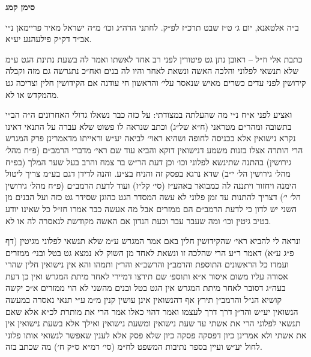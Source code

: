 \documentclass[12pt, openany]{book}
\newcommand{\chapname}{}
\newcommand{\newchap}[1]{
	\addcontentsline{toc}{chapter}{#1}
	\renewcommand{\chapname}{#1}
		\begin{center}
			\textbf{%
\fontsize{16pt}{16pt}\selectfont
				#1}
		\end{center}
}
\begin{document}
\newchap{סימן קמג}
\begin{multicols}{2}
ב״ה אלטאנא, יום ג׳ ט״ז שבט תרכ״ז לפ״ק. לחתני הרה״ג וכו׳ מ״ה ישראל מאיר פריימאן נ״י אב״ד דק״ק פילעהנע יע״א.\\\vspace{0pt}

כתבת אלי וז״ל – ראובן נתן גט פיטורין לפני רב אחד לאשתו ואמר לה בשעת נתינת הגט ע״מ שלא תנשאי לפלוני והלכה האשה ונשאת לאחר והיו לה בנים ואח״כ נתגרשה גם מזה וקבלה קידושין לפני עדים כשרים מאיש שנאסר עלי׳ והראשון חי עודנה אם הקידושין חלין וצריכה גט מהמקדש או לא.\\\vspace{0pt}

ואציע לפני א״ח נ״י מה שהעלתה במצודתי: על כזה כבר נשאלו גדולי האחרונים ה״ה הב״י בתשובה ומהר״ם מטראני (ח״א של״ג) וכתב שנראה לו פשוט שלא עברה על התנאי דאינו נקרא נישואין אלא בכניסה לחופה ושהיא ראוי׳ לביאה יע״ש וראייתו מדאמרינן פרק המגרש הרי הותרה אצלו בזנות משמע דנישואין דוקא והביא עוד שם ראי׳ מדברי הרמב״ם (פ״ח מהל׳ גירושין) בהתנה שתינשא לפלוני וכו׳ וכן דעת הר״ש בר צמח והרב בעל שער המלך (בפ״ח מהל׳ גירושין הל׳ י״ב) שדא נרגא בפסק זה והניח בצ״ע. והנה לדידן דגם בע״מ צריך ליטול הימנה ויחזור ויתננה לה כמבואר באהע״ז (סי׳ קל״ז) ועוד לדעת הרמב״ם (פ״ח מהל׳ גירושין הל׳ י׳) דצריך להתנות עד זמן פלוני לא עשה המסדר הגט כהוגן שסידר גט כזה ועל הבנים מן השני יש לדון כי לדעת הרמב״ם הם ממזרים אבל מה אעשה כבר אמרו חז״ל כל שאינו יודע בטיב גיטין וכו׳ ומה שעבר עבר וכעת הנדון אם האשה מקודשת לנאסרה לה או לא.\\\vspace{0pt}

ונראה לי להביא ראי׳ שהקידושין חלין באם אמר המגרש ע״מ שלא תנשאי לפלוני מגיטין (דף פ״ג ע״א) דאמר ר״ע הרי שהלכה זו ונשאת לאחד מן השוק לא נמצא גט בטל ובני׳ ממזרים ועמדו כל הראשונים התוספת והרמב״ן והרשב״א והר״ן ותמהו והא אין נישואין חלין שהרי אסורה עליו משום איסור א״א ותוספ׳ שם תירצו דמיירי לאחר מיתת המגרש ואין כן דעת בעה״ג דסובר לאחר מיתת המגרש אין הגט בטל ובנים מהשני לא הוי ממזרים א״כ יקשה קושיא הנ״ל והרמב״ן תירץ אף דהנשואין אינן עושין קנין מ״מ ע״י תנאי נאסרה במעשה הנשואין יע״ש והר״ן דרך דרך לעצמו ואמר דהוי כאלו אמר הרי את מותרת לכ״א אלא שאם תנשאי לפלוני הרי את אשתי עד שעת נישואין ומשעת נישואין ואילך אלא בשעת נישואין אין את אשתי ולא אמרינן כיון דפסקה פסקה כיון שלא פסק אלא לענין שאפשר לנשואי אותו פלוני לחול יע״ש ועיין בספר נתיבות המשפט לח״מ (סי׳ רמ״א ס״ק ח׳) מה שכתב בזה.\\\vspace{0pt}


\end{multicols}
\end{document}
